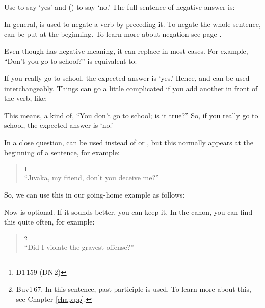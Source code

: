 Use  to say `yes' and  () to say `no.' The full sentence of negative answer is:


In general,  is used to negate a verb by preceding it. To negate the whole sentence,  can be put at the beginning. To learn more about negation see page \pageref{nip:neg}. 

Even though  has negative meaning, it can replace  in most cases. For example, ``Don't you go to school?'' is equivalent to:


If you really go to school, the expected answer is `yes.' Hence,  and  can be used interchangeably. Things can go a little complicated if you add another  in front of the verb, like:


This means, a kind of, ``You don't go to school; is it true?'' So, if you really go to school, the expected answer is `no.'

In a close question,  can be used instead of  or , but this normally appears at the beginning of a sentence, for example:

\begin{quote}
\footnote{D1\,159 (DN\,2)}\\
``J\=ivaka, my friend, don't you deceive me?''\\
\end{quote}

So, we can use this in our going-home example as follows:


Now  is optional. If it sounds better, you can keep it. In the canon, you can find this quite often, for example:

\begin{quote}
\footnote{Buv1\,67. In this sentence, past participle is used. To learn more about this, see Chapter \ref{chap:pp}.}\\
``Did I violate the gravest offense?''
\end{quote}

